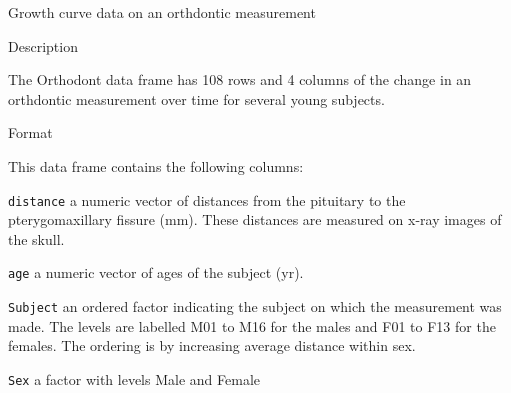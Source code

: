 Growth curve data on an orthdontic measurement


Description

The Orthodont data frame has 108 rows and 4 columns of the change in an orthdontic measurement 
over time for several young subjects.

Format

This data frame contains the following columns:

\texttt{distance}
a numeric vector of distances from the pituitary to the pterygomaxillary fissure (mm). These distances are measured on x-ray images of the skull.

\texttt{age}
a numeric vector of ages of the subject (yr).

\texttt{Subject}
an ordered factor indicating the subject on which the measurement was made. The levels are labelled M01 to M16 for the males and F01 to F13 for the females. The ordering is by increasing average distance within sex.

\texttt{Sex}
a factor with levels Male and Female



